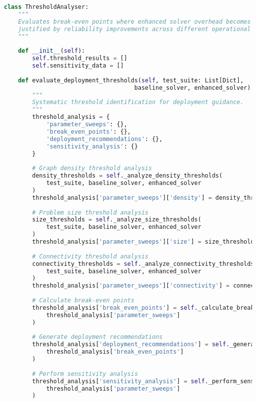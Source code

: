 \begin{lstlisting}[language=Python, caption=Threshold Analysis for Trade-off Boundaries]
class ThresholdAnalyser:
    """
    Evaluates break-even points where enhanced solver overhead becomes 
    justified by reliability improvements across different operational contexts.
    """
    
    def __init__(self):
        self.threshold_results = []
        self.sensitivity_data = []
        
    def evaluate_deployment_thresholds(self, test_suite: List[Dict], 
                                     baseline_solver, enhanced_solver) -> Dict:
        """
        Systematic threshold identification for deployment guidance.
        """
        threshold_analysis = {
            'parameter_sweeps': {},
            'break_even_points': {},
            'deployment_recommendations': {},
            'sensitivity_analysis': {}
        }
        
        # Graph density threshold analysis
        density_thresholds = self._analyze_density_thresholds(
            test_suite, baseline_solver, enhanced_solver
        )
        threshold_analysis['parameter_sweeps']['density'] = density_thresholds
        
        # Problem size threshold analysis
        size_thresholds = self._analyze_size_thresholds(
            test_suite, baseline_solver, enhanced_solver
        )
        threshold_analysis['parameter_sweeps']['size'] = size_thresholds
        
        # Connectivity threshold analysis
        connectivity_thresholds = self._analyze_connectivity_thresholds(
            test_suite, baseline_solver, enhanced_solver
        )
        threshold_analysis['parameter_sweeps']['connectivity'] = connectivity_thresholds
        
        # Calculate break-even points
        threshold_analysis['break_even_points'] = self._calculate_break_even_points(
            threshold_analysis['parameter_sweeps']
        )
        
        # Generate deployment recommendations
        threshold_analysis['deployment_recommendations'] = self._generate_deployment_guidance(
            threshold_analysis['break_even_points']
        )
        
        # Perform sensitivity analysis
        threshold_analysis['sensitivity_analysis'] = self._perform_sensitivity_analysis(
            threshold_analysis['parameter_sweeps']
        )
        

\end{lstlisting}

